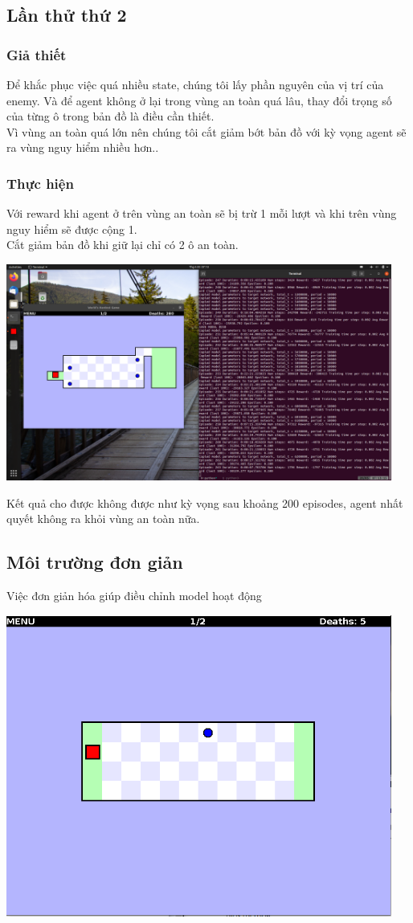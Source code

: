 \documentclass[12pt,a4paper]{article}
\begin{document}
\subsection{Lần thử thứ 2}
\subsubsection{Giả thiết}
Để khắc phục việc quá nhiều state, chúng tôi lấy phần nguyên của vị trí của enemy. Và để agent không ở lại trong vùng an toàn quá lâu, thay đổi trọng số của từng ô trong bản đồ là điều cần thiết.\\
Vì vùng an toàn quá lớn nên chúng tôi cắt giảm bớt bản đồ với kỳ vọng agent sẽ ra vùng nguy hiểm nhiều hơn..
\subsubsection{Thực hiện}
Với reward khi agent ở trên vùng an toàn sẽ bị trừ 1 mỗi lượt và khi trên vùng nguy hiểm sẽ được cộng 1.\\
Cắt giảm bản đồ khi giữ lại chỉ có 2 ô an toàn.\\
\begin{center}
\includegraphics[width=0.95\textwidth]{Thesis_image/try2.png}\\    
\end{center}
Kết quả cho được không được như kỳ vọng sau khoảng 200 episodes, agent nhất quyết không ra khỏi vùng an toàn nữa.
\subsection{Môi trường đơn giản}
Việc đơn giản hóa giúp điều chỉnh model hoạt động 
\begin{center}
\includegraphics[width=0.95\textwidth]{photo/ThesisRES/1eUp.png}\\    

\end{center}
\end{document}
